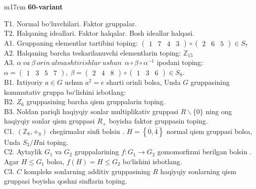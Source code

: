 \documentclass{article}
\begin{document}
\begin{tabular}{m{17cm}}
\textbf{60-variant}
\newline

T1. Normal bo`luvchilari. Faktor gruppalar. \\
T2. Halqaning ideallari. Faktor halqalar. Bosh ideallar halqasi. \\
A1. Gruppaning elementlar tartibini toping: \(\begin{pmatrix}
1 & 7 & 4 & 3
\end{pmatrix} \circ \begin{pmatrix}
2 & 6 & 5
\end{pmatrix} \in S_{7}\) \\
A2. Halqaning barcha teskarilanuvchi elementlarin toping: \(\mathbb{Z}_{15}\) \\
A3. \(\alpha\ va\ \beta\ orin\ almashtirishlar\ ushun\ \ \alpha \circ \beta \circ \alpha^{- 1}\) ipodani toping:\(\alpha = \begin{pmatrix}
1 & 3 & 5 & 7
\end{pmatrix},\ \beta = \begin{pmatrix}
2 & 4 & 8
\end{pmatrix} \circ \begin{pmatrix}
1 & 3 & 6
\end{pmatrix} \in S_{8}\). \\
B1. Ixtiyoriy \(a \in G\) uchun \(a^{2} = e\) sharti orinli bolsa, Unda \(G\) gruppasining kommutativ gruppa bo`lishini isbotlang: \\
B2. \(Z_{6}\) gruppasining barcha qism gruppalarin toping. \\
B3. Noldan pariqli haqiyqiy sonlar multiplikativ gruppasi \(R\backslash\{ 0\}\) ning o\textquotesingle ng haqiyqiy sonlar qism gruppasi \(R_{+}\) boyisha faktor gruppasin toping. \\
C1. \(\left( \mathbb{Z}_{8}, +_{8} \right)\) chegirmalar sinfi bo\textquotesingle lsin . \(H = \left\{ \overline{0},\overline{4} \right\}\) normal qism gruppasi bolsa, Unda \(S_{3}/H\)ni toping. \\
C2. Aytaylik \(G_{1}\) va \(G_{2}\) gruppalarining \(f:G_{1} \rightarrow G_{2}\) gomomorfizmi berilgan bo\textquotesingle lsin . Agar \(H \leq G_{1}\) bolsa, \(f(H) = H \leq G_{2}\) bo`lishini isbotlang. \\
C3. \(C\) kompleks sonlarning additiv gruppasining \(R\) haqiyqiy sonlarning qism gruppasi boyisha qo\textquotesingle shni sinflarin toping. \\

\end{tabular}
\vspace{1cm}
\end{document}
